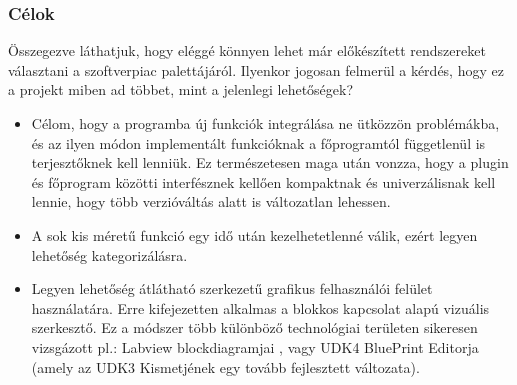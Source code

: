 \documentclass[a4paper,12pt,oneside]{report}
\begin{document}
\subsubsection{Célok}
Összegezve láthatjuk, hogy eléggé könnyen lehet már előkészített rendszereket választani a szoftverpiac palettájáról. Ilyenkor jogosan felmerül a kérdés, hogy ez a projekt miben ad többet, mint a jelenlegi lehetőségek? 
\begin{itemize}

\item Célom, hogy a programba új funkciók integrálása ne ütközzön problémákba, és az ilyen módon implementált funkcióknak a főprogramtól függetlenül is terjesztőknek kell lenniük. Ez természetesen maga után vonzza, hogy a plugin és főprogram közötti interfésznek kellően kompaktnak és univerzálisnak kell lennie, hogy több verzióváltás alatt is változatlan lehessen.

\item A sok kis méretű funkció egy idő után kezelhetetlenné válik, ezért legyen lehetőség kategorizálásra.

\item Legyen lehetőség átlátható szerkezetű grafikus felhasználói felület használatára. Erre kifejezetten alkalmas a blokkos kapcsolat alapú vizuális szerkesztő. Ez a módszer több különböző technológiai területen sikeresen vizsgázott pl.: Labview blockdiagramjai \cite{website:ni_blocks}, vagy UDK4 BluePrint Editorja\cite{website:udk_blueprint} (amely az UDK3 Kismetjének egy tovább fejlesztett változata).
\end{itemize}
\end{document}
